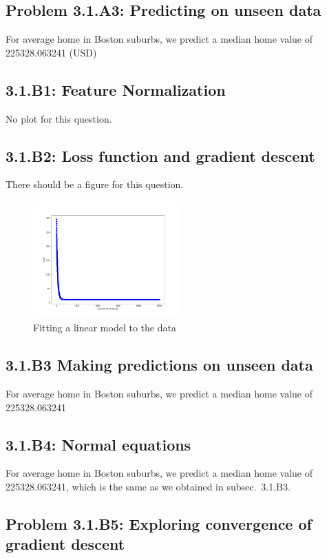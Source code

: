 \documentclass[english,11pt]{article}
\begin{document}
\subsection*{Problem 3.1.A3: Predicting on unseen data}
For average home in Boston suburbs, we predict a median home value of 225328.063241 (USD)

\subsection*{3.1.B1: Feature Normalization}
No plot for this question.

\subsection*{3.1.B2: Loss function and gradient descent}
There should be a figure for this question.
\begin{figure}[H]
\centering
\includegraphics[width=0.5\textwidth]{../hw1/part1/fig3_1_B_Muiti.png}
\caption{Fitting a linear model to the data}
\label{fig:linear_fit}
\end{figure}

\subsection*{3.1.B3 Making predictions on unseen data\label{subsec:3_1_B3}}
For average home in Boston suburbs, we predict a median home value of 225328.063241

\subsection*{3.1.B4: Normal equations}
For average home in Boston suburbs, we predict a median home value of 225328.063241, which is the same as we obtained in subsec.~3.1.B3.


\subsection*{Problem 3.1.B5: Exploring convergence of gradient descent}
\end{document}
